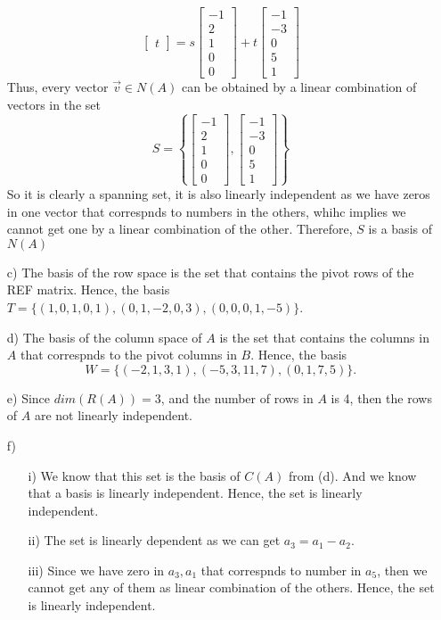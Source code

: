 \documentclass[a4paper,12pt]{article}
\begin{document}
\begin{itemize}
\[\begin{bmatrix}
    t
  \end{bmatrix}= s\begin{bmatrix}
    -1 \\
    2\\
    1 \\
    0\\
    0
  \end{bmatrix}+t\begin{bmatrix}
    -1 \\
    -3\\
     0\\
    5\\
    1
  \end{bmatrix}\]
  Thus, every vector $\vec{v} \in N(A)$ can be obtained by a linear combination of vectors in the set
  \[S=\left\{\begin{bmatrix}
    -1 \\
    2\\
    1 \\
    0\\
    0
  \end{bmatrix},\begin{bmatrix}
    -1 \\
    -3\\
     0\\
    5\\
    1
  \end{bmatrix}\right\}\]
  So it is clearly a spanning set, it is also linearly independent as we have zeros in one vector that correspnds to numbers in the others, whihc implies we cannot get one by a linear combination of the other. Therefore, $S$ is a basis of $N(A)$
  \item [c)] The basis of the row space is the set that contains the pivot rows of the REF matrix. Hence, the basis $T=\{(1,0,1,0,1), (0,1,-2,0,3),(0,0,0,1,-5)\}$.
  \item [d)] The basis of the column space of $A$ is the set that contains the columns in $A$ that correspnds to the pivot columns in $B$. Hence, the basis \[W=\{(-2,1,3,1),(-5,3,11,7),(0,1,7,5)\}.\]
  \item [e)] Since $dim(R(A))=3$, and the number of rows in $A$ is 4, then the rows of $A$ are not linearly independent.
  \item [f)]\begin{itemize}
    \item [i)] We know that this set is the basis of $C(A)$ from (d). And we know that a basis is linearly independent. Hence, the set is linearly independent.
    \item [ii)] The set is linearly dependent as we can get $a_{3}=a_1-a_2.$
    \item [iii)] Since we have zero in $a_3,a_1$ that correspnds to number in $a_5$, then we cannot get any of them as linear combination of the others. Hence, the set is linearly independent.
  \end{itemize}
\end{itemize}
\end{document}
